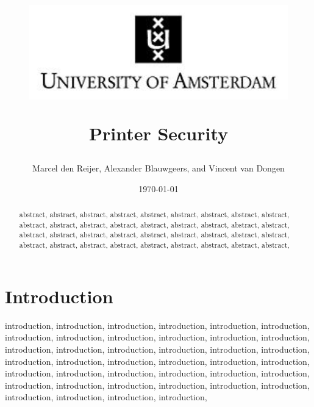 \documentclass[a4paper]{article}
\begin{document}
	\title{
	\begin{figure}[!ht]
	\begin{center}
			\includegraphics[width=1.0\textwidth]{jpg.jpg}
	\end{center}
	\end{figure}
	\Huge Printer Security 
	}
	
	
	\author
	{\large {Marcel den Reijer, Alexander Blauwgeers, and Vincent van Dongen } }

	\date{
	\today
	}
	\maketitle
	\setlength{\parindent}{0pt}

\vspace{0cm}
\begin{abstract}
abstract, abstract, abstract, abstract, abstract, abstract, abstract, abstract, abstract, abstract, abstract, abstract, abstract, abstract, abstract, abstract, abstract, abstract, abstract, abstract, abstract, abstract, abstract, abstract, abstract, abstract, abstract, abstract, abstract, abstract, abstract, abstract, abstract, abstract, abstract, abstract, 
\end{abstract}
	\newpage
	\tableofcontents
	\newpage
	
\section{Introduction} %
\label{sec:introduction}
introduction, introduction, introduction, introduction, introduction, introduction, introduction, introduction, introduction, introduction, introduction, introduction, introduction, introduction, introduction, introduction, introduction, introduction, introduction, introduction, introduction, introduction, introduction, introduction, introduction, introduction, introduction, introduction, introduction, introduction, introduction, introduction, introduction, introduction, introduction, introduction, introduction, introduction, introduction, introduction, 
\end{document}
